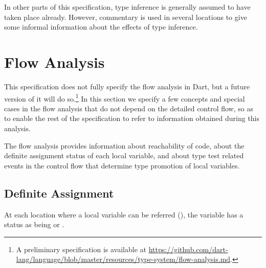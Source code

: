 \documentclass[makeidx]{article}
\begin{document}
\LMHash{}%
In other parts of this specification,
type inference is generally assumed to have taken place already.
However, commentary is used in several locations to give some informal
information about the effects of type inference.


\section{Flow Analysis}

\LMHash{}%
This specification does not fully specify the flow analysis in Dart,
but a future version of it will do so.\!\footnote{%
A preliminary specification is available at
\url{https://github.com/dart-lang/language/blob/master/resources/type-system/flow-analysis.md}.%
}
In this section we specify a few concepts and special cases
in the flow analysis
that do not depend on the detailed control flow,
so as to enable the rest of the specification to refer to information
obtained during this analysis.

\LMHash{}%
The flow analysis provides information about reachability of code,
about the definite assignment status of each local variable,
and about type test related events in the control flow
that determine type promotion of local variables.


\subsection{Definite Assignment}

\LMHash{}%
At each location where a local variable can be referred
(),
the variable has a status as being
 or
.

\end{document}
